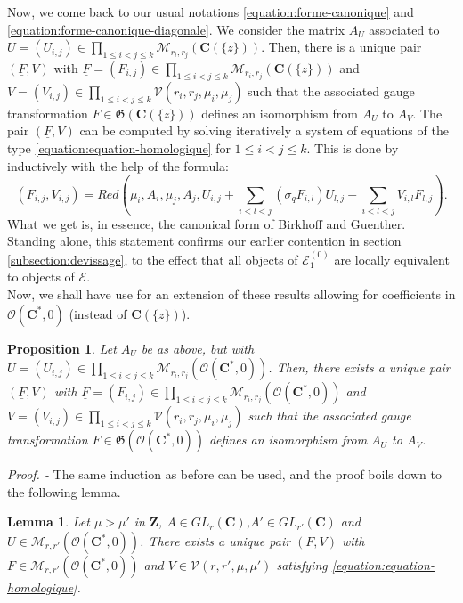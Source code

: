 \documentclass[english]{smfart}
\newtheorem{lemma}[thm]{Lemma}
\newtheorem{prop}[thm]{Proposition}
\numberwithin{equation}{thm}
\def \Pr {\textsl{Proof. - }}
\def\sq{\sigma_q}
\def\C{{\mathbf C}}
\def\Z{{\mathbf Z}}
\def\M{{\mathcal{M}}}
\def\VV{{\mathcal{V}}}
\def\EE{{\mathcal{E}}}
\def\G{{\mathfrak{G}}}
\def\Ka{{\C(\{z\})}}
\def\Rwg{{\mathcal{O}(\C^{*},0)}}
\def\l{\left}
\def\r{\right}
\begin{document}
Now, we come back to our usual notations \ref{equation:forme-canonique}
and \ref{equation:forme-canonique-diagonale}. We consider the matrix
$A_{U}$ associated to
$U = (U_{i,j}) \in 
\underset{1 \leq i < j \leq k}{\prod} \M_{r_{i},r_{j}}(\Ka)$.
Then, there is a unique pair $(\underline{F},V)$ with
$\underline{F} = (F_{i,j}) \in 
\underset{1 \leq i < j \leq k}{\prod} \M_{r_{i},r_{j}}(\Ka)$
and
$V = (V_{i,j}) \in 
\underset{1 \leq i < j \leq k}{\prod} \VV(r_{i},r_{j},\mu_{i},\mu_{j})$
such that the associated gauge transformation $F \in \G(\Ka)$   
defines an isomorphism from $A_{U}$ to $A_{V}$. The pair $(\underline{F},V)$
can be computed by solving iteratively a system of equations 
of the type \ref{equation:equation-homologique} for $1 \leq i < j \leq k$.
This is done by inductively with the help of the formula:
$$
(F_{i,j},V_{i,j}) = Red\l(\mu_{i},A_{i},\mu_{j},A_{j},
U_{i,j} + \underset{{i < l < j}}{\sum} \l(\sq F_{i,l}\r) U_{l,j}
- \underset{i < l < j}{\sum} V_{i,l} F_{l,j}\r).
$$
What we get is, in essence, the canonical form of Birkhoff and
Guenther. Standing alone, this statement confirms our earlier 
contention in section \ref{subsection:devissage}, to the effect 
that all objects of $\EE_{1}^{(0)}$ are locally equivalent to 
objects of $\EE$. \\

Now, we shall have use for an extension of these results allowing 
for coefficients in $\Rwg$ (instead of $\Ka$).

\begin{prop} \label{prop:Rwg=Ka}
Let $A_{U}$ be as above, but with 
$U = (U_{i,j}) \in 
\underset{1 \leq i < j \leq k}{\prod} \M_{r_{i},r_{j}}(\Rwg)$.
Then, there exists a unique pair $(\underline{F},V)$ with
$\underline{F} = (F_{i,j}) \in 
\underset{1 \leq i < j \leq k}{\prod} \M_{r_{i},r_{j}}(\Rwg)$
and
$V = (V_{i,j}) \in 
\underset{1 \leq i < j \leq k}{\prod} \VV(r_{i},r_{j},\mu_{i},\mu_{j})$
such that the associated gauge transformation $F \in \G(\Rwg)$   
defines an isomorphism from $A_{U}$ to $A_{V}$.
\end{prop}

\Pr 
The same induction as before can be used, and the proof boils down to
the following lemma.

\begin{lemma}
Let $\mu > \mu'$ in $\Z$, $A \in GL_{r}(\C)$,$A' \in GL_{r'}(\C)$
and $U \in \M_{r,r'}(\Rwg)$.
There exists a unique pair $(F,V)$ with 
$F \in \M_{r,r'}(\Rwg)$ and $V \in \VV(r,r',\mu,\mu')$ 
satisfying \ref{equation:equation-homologique}.
\end{lemma}
\end{document}
